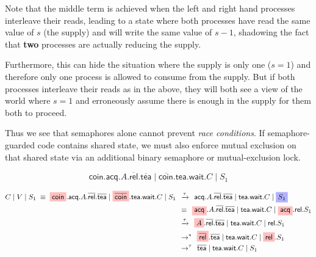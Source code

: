 \documentclass{article}
\newcommand{\act}[1]{\textsf{#1}}
\newcommand{\highlightG}[1]{%
  \colorbox{blue!30}{$\displaystyle#1$}}
\newcommand{\highlightR}[1]{%
  \colorbox{red!25}{$\displaystyle#1$}}
\theoremstyle{definition}
\newcommand{\src}[1]{\highlightR{#1}}
\newcommand{\srch}[1]{\highlightG{#1}}
\begin{document}
\noindent
Note that the middle term is achieved when the left and right
hand processes interleave their reads, leading to a state where
both processes have read the same value of $s$ (the supply) and will write the
same value of $s-1$, shadowing the fact that \textbf{two} processes are actually
reducing the supply.

Furthermore, this can hide the situation where the supply is only one
($s = 1$) and therefore only one process is allowed to consume from the supply.
But if both processes interleave their reads as in the above, they will both
see a view of the world where $s = 1$ and erroneously assume there is
enough in the supply for them both to proceed.

Thus we see that semaphores alone cannot prevent \emph{race conditions}.
If semaphore-guarded code contains shared state, we must also enforce
mutual exclusion on that shared state via an additional binary semaphore
or mutual-exclusion lock.

\iffalse

\begin{equation*}
{\mathsf{coin}}.\mathsf{acq}.A.\overline{\mathsf{rel}}.\overline{\mathsf{tea}}
\mid
{\overline{\mathsf{coin}}}.\mathsf{tea}.\mathsf{wait}.C
\mid
S_1
\end{equation*}

\begin{align*}
C \mid V \mid S_1
\; \equiv \;
\src{\mathsf{coin}}.\mathsf{acq}.A.\overline{\mathsf{rel}}.\overline{\mathsf{tea}}
\mid
\src{\overline{\mathsf{coin}}}.\mathsf{tea}.\mathsf{wait}.C
\mid
S_1
& \,\; \xrightarrow{\tau} \;\,
\mathsf{acq}.A.\overline{\mathsf{rel}}.\overline{\mathsf{tea}}
\mid \mathsf{tea}.\mathsf{wait}.C
\mid \srch{S_1} \\
& \,\; \equiv \;\,
\src{\mathsf{acq}}.A.\overline{\mathsf{rel}}.\overline{\mathsf{tea}}
\mid \mathsf{tea}.\mathsf{wait}.C
\mid \src{\act{acq}}.\act{rel}.S_1 \\
& \,\; \xrightarrow{\tau} \;\,
\src{A}.\overline{\mathsf{rel}}.\overline{\mathsf{tea}}
\mid \mathsf{tea}.\mathsf{wait}.C
\mid \act{rel}.S_1 \\
& \,\; \rightarrow^\ast \;\,
\src{\overline{\mathsf{rel}}}.\overline{\mathsf{tea}}
\mid \mathsf{tea}.\mathsf{wait}.C
\mid \src{\act{rel}}.S_1 \\
& \,\; \rightarrow^\tau \;\,
\overline{\mathsf{tea}}
\mid \mathsf{tea}.\mathsf{wait}.C
\mid S_1 \\
\end{align*}
\end{document}
